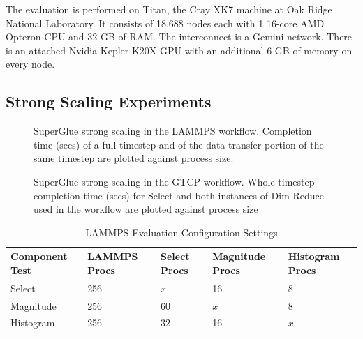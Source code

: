 \documentclass[conference]{IEEEtran}
\begin{document}
The evaluation is performed on Titan, the Cray XK7 machine at Oak Ridge
National Laboratory. It consists of 18,688 nodes each with 1 16-core AMD
Opteron CPU and 32 GB of RAM. The interconnect is a Gemini network. There is an
attached Nvidia Kepler K20X GPU with an additional 6 GB of memory on every
node.


\subsection{Strong Scaling Experiments}


\begin{figure}
  \centering
  \vspace{-0.25in}
  
  \vspace{-0.15in}
  
  \vspace{-0.17in}
  
  \vspace{-0.05in}
  \caption{SuperGlue strong scaling in the LAMMPS workflow.
    Completion time (secs) of a full timestep and of the data transfer
    portion of the same timestep are plotted against process size.}
  \label{fig:lammps-strong}
  \vspace{-0.18in}
\end{figure}

\begin{figure}
  \centering
  \vspace{-0.17in}
  
  \vspace{-0.17in}
  
  \vspace{-0.06in}
  \caption{SuperGlue strong scaling in the GTCP workflow. Whole timestep
    completion time (secs) for Select and both instances of Dim-Reduce used in
    the workflow are plotted against process size}
  \label{fig:gtcp-strong}
  \vspace{-0.25in}
\end{figure}

  

\begin{table}[tbp]
\centering
\caption{LAMMPS Evaluation Configuration Settings}
\label{tab:eval-strong-lammps}
\vspace{-0.15in}
\begin{tabular}{|l|l|l|l|l|}
\hline
Component Test & LAMMPS Procs & Select Procs & Magnitude Procs & Histogram Procs \\
\hline
Select & 256 & $x$ & 16 & 8\\
\hline
Magnitude & 256 & 60 & $x$ & 8\\
\hline
Histogram & 256 & 32 & 16 & $x$\\
\hline
\end{tabular}
\end{table}
\end{document}
